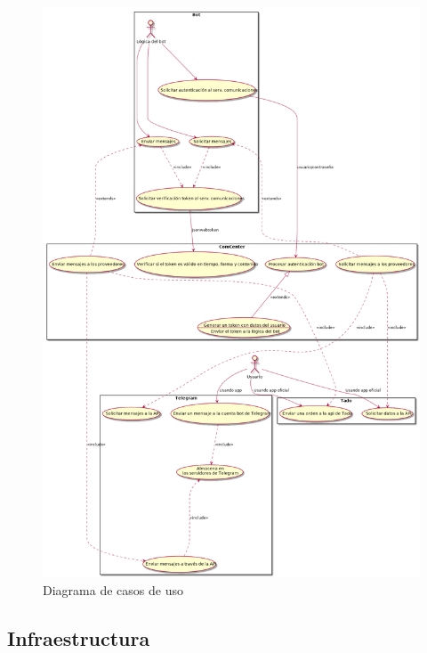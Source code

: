 \documentclass[spanish,12pt, a4paper, twoside]{paper}
\begin{document}
\begin{figure}
\centering
	\includegraphics[width=\textwidth]{recursos/usecases}
\caption{Diagrama de casos de uso}
\label{fig:Diagrama de casos de uso}
\end{figure}

\subsection{Infraestructura}
\end{document}
